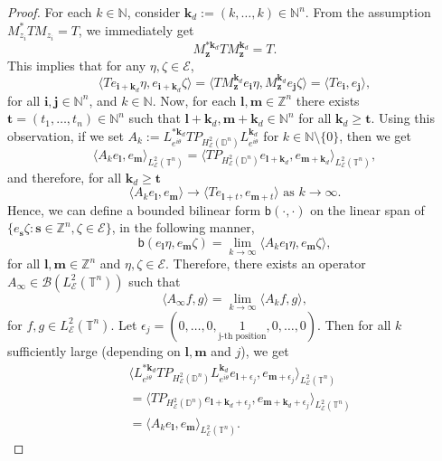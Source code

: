 \documentclass[12pt]{amsart}
\theoremstyle{definition}
\newcommand{\Nat}{\mathbb{N}}
\newcommand{\Int}{\mathbb{Z}}
\newcommand{\D}{\mathbb{D}}
\newcommand{\1}{{\mbox{\bf 1}}}
\newcommand{\clb}{\mathcal{B}}
\newcommand{\cle}{\mathcal{E}}
\newcommand{\raro}{\rightarrow}
\begin{document}
\begin{proof}
For each $k \in \Nat$, consider $\bm{k}_d := (k,\ldots,k) \in \Nat^n$.  From the assumption $M_{z_i}^* T M_{z_i} = T$, we immediately get
\[
M_{\bm{z}}^{* \bm{k}_d} T M_{\bm{z}}^{ \bm{k}_d} = T.
\]
This implies that for any $\eta, \zeta \in \cle$,
\[
\langle T e_{\bm{i} + \bm{k}_d} \eta, e_{\bm{i} + \bm{k}_d} \zeta\rangle = \langle T M_{\bm{z}}^{\bm{k}_d}e_{\bm{i}} \eta,  M_{\bm{z}}^{\bm{k}_d} e_{\bm{j}} \zeta\rangle  = \langle T e_{\bm{i}}, e_{\bm{j}} \rangle,
\]
for all $\bm{i}, \bm{j} \in \Nat^n$, and $k \in \Nat$.  Now, for each $\bm{l}, \bm{m} \in \Int^n$ there exists $\bm{t} = (t_1,\ldots,t_n) \in \Nat^n$ such that $\bm{l}+\bm{k}_d, \bm{m}+\bm{k}_d \in \Nat^n$ for all $\bm{k}_d \geq \bm{t}$. Using this observation, if we set $A_k := L_{e^{i\theta}}^{* \bm{k}_d} T P_{H_{\cle}^2(\D^n)} L_{e^{i\theta}}^{\bm{k}_d}$ for $k \in \Nat \setminus \{0\}$, then we get
\[
\langle A_k e_{\bm{l}}, e_{\bm{m}} \rangle_{L_{\cle}^2(\mathbb{T}^n)} = \langle T P_{H_{\cle}^2(\D^n)} e_{\bm{l}+\bm{k}_d}, e_{\bm{m}+\bm{k}_d} \rangle_{L_{\cle}^2(\mathbb{T}^n)},
\]
and therefore, for all $\bm{k}_d \geq \bm{t}$
\[
\langle A_k e_{\bm{l}}, e_{\bm{m}} \rangle \raro \langle T e_{\bm{l}+t}, e_{\bm{m}+t} \rangle \text{ as } k \raro \infty.
\]
Hence, we can define a bounded bilinear form $\textsf{b}(\cdot,\cdot)$ on the linear span of $\{e_{\bm{s}} \zeta: \bm{s} \in \Int^n, \zeta \in \cle\}$, in the following manner,
\[
\textsf{b}(e_{\bm{l}}\eta, e_{\bm{m}}\zeta) = \lim_{k \raro \infty} \langle A_k e_{\bm{l}}\eta, e_{\bm{m}}\zeta \rangle,
\]
for all $\bm{l}, \bm{m} \in \Int^n$ and $\eta, \zeta \in \cle$. Therefore, there exists an operator $A_{\infty} \in \clb(L_{\cle}^2(\mathbb{T}^n))$ such that 
\[
\langle A_{\infty} f,g \rangle = \lim_{k \raro \infty} \langle A_k f,g \rangle,
\]
for $f,g \in L_{\cle}^2(\mathbb{T}^n)$. Let $\epsilon_j = (0,\ldots, 0,\underset{\text{j-th position}}{1},0, \ldots,0)$. Then for all $k$ sufficiently large (depending on $\bm{l}, \bm{m}$ and $j$), we get
\begin{align*}
&\langle L_{e^{i \theta}}^{* \bm{k}_d} T P_{H_{\cle}^2(\D^n)} L_{e^{i \theta}}^{\bm{k}_d} e_{\bm{l} + \epsilon_j}, e_{\bm{m} + \epsilon_j} \rangle_{L_{\cle}^2(\mathbb{T}^n)}  \\
&= \langle T P_{H_{\cle}^2(\D^n)}  e_{\bm{l} + \bm{k}_d + \epsilon_j}, e_{\bm{m} + \bm{k}_d + \epsilon_j} \rangle_{L_{\cle}^2(\mathbb{T}^n)} \\
&= \langle A_{k} e_{\bm{l}}, e_{\bm{m}} \rangle_{L_{\cle}^2(\mathbb{T}^n)}.
\end{align*}

\end{proof}
\end{document}
